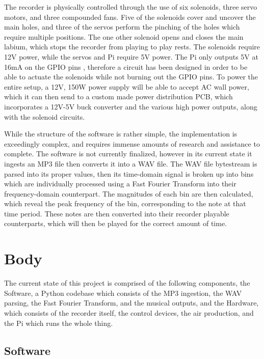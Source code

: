 \documentclass[UTF8, 12pt]{article}
\begin{document}
    The recorder is physically controlled through the use of six solenoids, three servo motors, and three compounded fans. Five of the solenoids cover and uncover the main holes, and three of the servos perform the pinching of the holes which require multiple positions. The one other solenoid opens and closes the main labium, which stops the recorder from playing to play rests. The solenoids require 12V power, while the servos and Pi require 5V power. The Pi only outputs 5V at 16mA on the GPIO pins \cite{ras_pi}, therefore a circuit has been designed in order to be able to actuate the solenoids while not burning out the GPIO pins. To power the entire setup, a 12V, 150W power supply will be able to accept AC wall power, which it can then send to a custom made power distribution PCB, which incorporates a 12V-5V buck converter and the various high power outputs, along with the solenoid circuits. 

    While the structure of the software is rather simple, the implementation is exceedingly complex, and requires immense amounts of research and assistance to complete. The software is not currently finalized, however in its current state it ingests an MP3 file then converts it into a WAV file. The WAV file bytestream is parsed into its proper values, then its time-domain signal is broken up into bins which are individually processed using a Fast Fourier Transform into their frequency-domain counterpart. The magnitudes of each bin are then calculated, which reveal the peak frequency of the bin, corresponding to the note at that time period. These notes are then converted into their recorder playable counterparts, which will then be played for the correct amount of time.

\newpage
\section{Body}
    The current state of this project is comprised of the following components, the Software, a Python codebase which consists of the MP3 ingestion, the WAV parsing, the Fast Fourier Transform, and the musical outputs, and the Hardware, which consists of the recorder itself, the control devices, the air production, and the Pi which runs the whole thing.

\subsection{Software}
\end{document}
